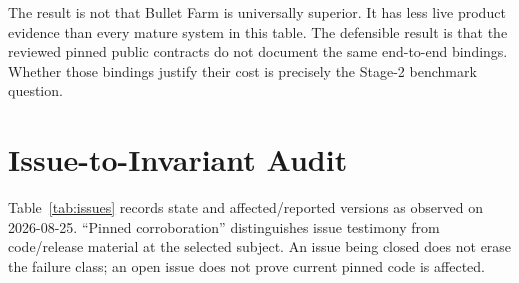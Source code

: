 \documentclass[journal]{IEEEtran}
\begin{document}
The result is not that Bullet Farm is universally superior. It has less live
product evidence than every mature system in this table. The defensible result
is that the reviewed pinned public contracts do not document the same
end-to-end bindings. Whether those bindings justify their cost is precisely
the Stage-2 benchmark question.

\section{Issue-to-Invariant Audit}
\label{sec:audit}

Table~\ref{tab:issues} records state and affected/reported versions as observed
on 2026-08-25. ``Pinned corroboration'' distinguishes issue testimony from
code/release material at the selected subject. An issue being closed does not
erase the failure class; an open issue does not prove current pinned code is
affected.
\end{document}
